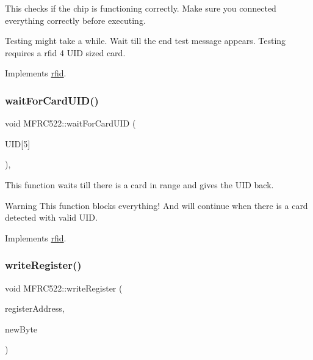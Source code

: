 This checks if the chip is functioning correctly. Make sure you connected everything correctly before executing. 

Testing might take a while. Wait till the end test message appears. Testing requires a rfid 4 U\+ID sized card. 

Implements \mbox{\hyperlink{classrfid_adc4009859b77330fd5b3d0515337ac40}{rfid}}.

\mbox{\label{class_m_f_r_c522_aeb05c83c2d139eb2c57f400399982691}} 
\subsubsection{\texorpdfstring{wait\+For\+Card\+U\+I\+D()}{waitForCardUID()}}
{\footnotesize\ttfamily void M\+F\+R\+C522\+::wait\+For\+Card\+U\+ID (\begin{DoxyParamCaption}\item[{uint8\+\_\+t}]{U\+ID\mbox{[}5\mbox{]} }\end{DoxyParamCaption})\hspace{0.3cm}{\ttfamily [override]}, {\ttfamily [virtual]}}



This function waits till there is a card in range and gives the U\+ID back. 

\begin{DoxyWarning}{Warning}
This function blocks everything! And will continue when there is a card detected with valid U\+ID. 
\end{DoxyWarning}


Implements \mbox{\hyperlink{classrfid_a1b324cb1e7b4c377eca4b3495d4189fd}{rfid}}.

\mbox{\label{class_m_f_r_c522_aa976c78dde5b2dfbbd5bcbedaad14a7a}} 
\subsubsection{\texorpdfstring{write\+Register()}{writeRegister()}\hspace{0.1cm}{\footnotesize\ttfamily [1/2]}}
{\footnotesize\ttfamily void M\+F\+R\+C522\+::write\+Register (\begin{DoxyParamCaption}\item[{\mbox{\hyperlink{class_m_f_r_c522_ae7ec09eb8c9c61288a4770175b4b8db7}{R\+EG}}}]{register\+Address,  }\item[{uint8\+\_\+t}]{new\+Byte }\end{DoxyParamCaption})\hspace{0.3cm}{\ttfamily [protected]}}



